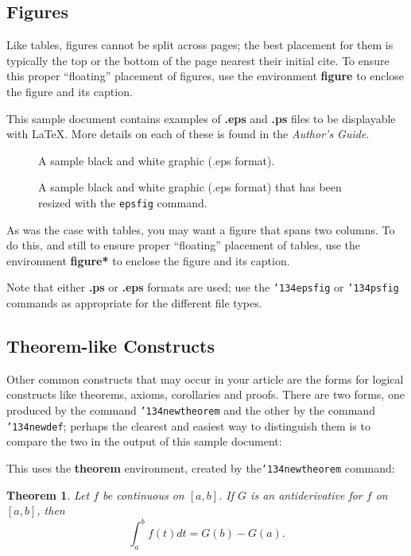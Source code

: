\documentclass{acm_proc_article-sp}
\begin{document}
\subsection{Figures}
Like tables, figures cannot be split across pages; the
best placement for them
is typically the top or the bottom of the page nearest
their initial cite.  To ensure this proper ``floating'' placement
of figures, use the environment
\textbf{figure} to enclose the figure and its caption.

This sample document contains examples of \textbf{.eps}
and \textbf{.ps} files to be displayable with \LaTeX.  More
details on each of these is found in the \textit{Author's Guide}.

\begin{figure}
\centering
{}
\caption{A sample black and white graphic (.eps format).}
\end{figure}

\begin{figure}
\centering
{}
\caption{A sample black and white graphic (.eps format)
that has been resized with the \texttt{epsfig} command.}
\end{figure}


As was the case with tables, you may want a figure
that spans two columns.  To do this, and still to
ensure proper ``floating'' placement of tables, use the environment
\textbf{figure*} to enclose the figure and its caption.

Note that either {\textbf{.ps}} or {\textbf{.eps}} formats are
used; use
the \texttt{{\char'134}epsfig} or \texttt{{\char'134}psfig}
commands as appropriate for the different file types.

\subsection{Theorem-like Constructs}
Other common constructs that may occur in your article are
the forms for logical constructs like theorems, axioms,
corollaries and proofs.  There are
two forms, one produced by the
command \texttt{{\char'134}newtheorem} and the
other by the command \texttt{{\char'134}newdef}; perhaps
the clearest and easiest way to distinguish them is
to compare the two in the output of this sample document:

This uses the \textbf{theorem} environment, created by
the\linebreak\texttt{{\char'134}newtheorem} command:
\newtheorem{theorem}{Theorem}
\begin{theorem}
Let $f$ be continuous on $[a,b]$.  If $G$ is
an antiderivative for $f$ on $[a,b]$, then
\begin{displaymath}\int^b_af(t)dt = G(b) - G(a).\end{displaymath}
\end{theorem}
\end{document}
